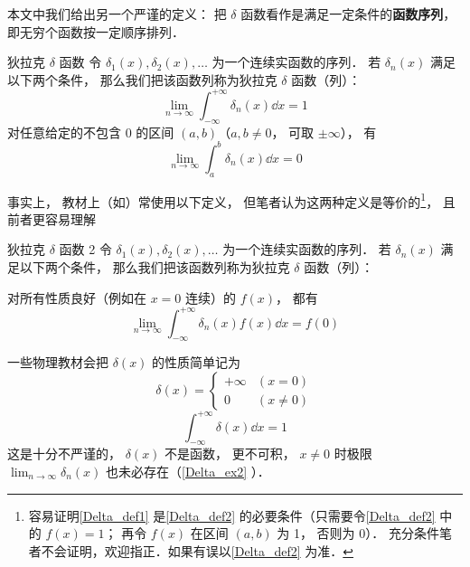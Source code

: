 本文中我们给出另一个严谨的定义： 把 $\delta$ 函数看作是满足一定条件的\textbf{函数序列}， 即无穷个函数按一定顺序排列．
\begin{definition}{狄拉克 $\delta$ 函数}\label{Delta_def1}
令 $\delta_1(x), \delta_2(x), \dots$ 为一个连续实函数的序列． 若 $\delta_n(x)$ 满足以下两个条件， 那么我们把该函数列称为狄拉克 $\delta$ 函数（列）：
\begin{equation}\label{Delta_eq5}
\lim_{n\to\infty}\int_{-\infty}^{+\infty} \delta_n(x) \dd{x} = 1
\end{equation}
对任意给定的不包含 0 的区间 $(a,b)$（$a,b \ne 0$， 可取 $\pm\infty$）， 有
\begin{equation}\label{Delta_eq4}
\lim_{n\to\infty} \int_{a}^{b} \delta_n(x) \dd{x} = 0
\end{equation}
\end{definition}
事实上， 教材上（如\cite{Arfken}）常使用以下定义， 但笔者认为这两种定义是等价的\footnote{容易证明\autoref{Delta_def1} 是\autoref{Delta_def2} 的必要条件（只需要令\autoref{Delta_def2} 中的 $f(x) = 1$； 再令 $f(x)$ 在区间 $(a,b)$ 为 1， 否则为 0）． 充分条件笔者不会证明，欢迎指正．如果有误以\autoref{Delta_def2} 为准．}， 且前者更容易理解

\begin{definition}{狄拉克 $\delta$ 函数 2}\label{Delta_def2}
令 $\delta_1(x), \delta_2(x), \dots$ 为一个连续实函数的序列． 若 $\delta_n(x)$ 满足以下两个条件， 那么我们把该函数列称为狄拉克 $\delta$ 函数（列）：

对所有性质良好（例如在 $x = 0$ 连续）的 $f(x)$， 都有
\begin{equation}
\lim_{n\to\infty}\int_{-\infty}^{+\infty} \delta_n(x)f(x) \dd{x} = f(0)
\end{equation}
\end{definition}

一些物理教材会把 $\delta(x)$ 的性质简单记为
\begin{equation}\label{Delta_eq2}
\delta(x) =
\begin{cases}
+\infty & (x = 0)\\
0 & (x \ne 0)
\end{cases}
\end{equation}
\begin{equation}\label{Delta_eq3}
\int_{-\infty}^{+\infty} \delta(x) \dd{x} = 1
\end{equation}
这是十分不严谨的， $\delta(x)$ 不是函数， 更不可积， $x \ne 0$ 时极限 $\lim_{n\to \infty}\delta_n(x)$ 也未必存在（\autoref{Delta_ex2} ）．

